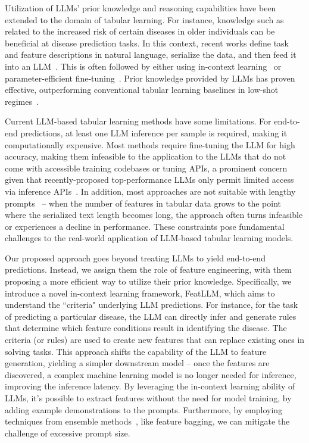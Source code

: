 Utilization of LLMs' prior knowledge and reasoning capabilities have been extended to the domain of tabular learning. For instance, knowledge such as related to the increased risk of certain diseases in older individuals can be beneficial at disease prediction tasks. In this context, recent works define task and feature descriptions in natural language, serialize the data, and then feed it into an LLM~\cite{dinh2022lift,wang2023anypredict}. This is often followed by either using in-context learning~\cite{nam2023semi} or parameter-efficient fine-tuning~\cite{dinh2022lift,hegselmann2023tabllm}. Prior knowledge provided by LLMs has proven effective, outperforming conventional tabular learning baselines in low-shot regimes~\cite{hegselmann2023tabllm}. 

Current LLM-based tabular learning methods have some limitations. For end-to-end predictions, at least one LLM inference per sample is required, making it computationally expensive. Most methods require fine-tuning the LLM for high accuracy, making them infeasible to the application to the LLMs that do not come with accessible training codebases or tuning APIs, a prominent concern given that recently-proposed top-performance LLMs only permit limited access via inference APIs~\cite{anil2023palm,openai2023gpt4}. In addition, most approaches are not suitable with lengthy prompts~\cite{liu2023lost} -- when the number of features in tabular data grows to the point where the serialized text length becomes long, the approach often turns infeasible or experiences a decline in performance. These constraints pose fundamental challenges to the real-world application of LLM-based tabular learning models. 

Our proposed approach goes beyond treating LLMs to yield end-to-end predictions. Instead, we assign them the role of feature engineering, with them proposing a more efficient way to utilize their prior knowledge. Specifically, we introduce a novel in-context learning framework, \textsf{FeatLLM}, which aims to understand the ``criteria" underlying LLM predictions. For instance, for the task of predicting a particular disease, the LLM can directly infer and generate rules that determine which feature conditions result in identifying the disease. The criteria (or rules) are used to create new features that can replace existing ones in solving tasks. This approach shifts the capability of the LLM to feature generation, yielding a simpler downstream model -- once the features are discovered, a complex machine learning model is no longer needed for inference, improving the inference latency. By leveraging the in-context learning ability of LLMs, it's possible to extract features without the need for model training, by adding example demonstrations to the prompts. Furthermore, by employing techniques from ensemble methods~\cite{breiman2001random}, like feature bagging, we can mitigate the challenge of excessive prompt size. 

